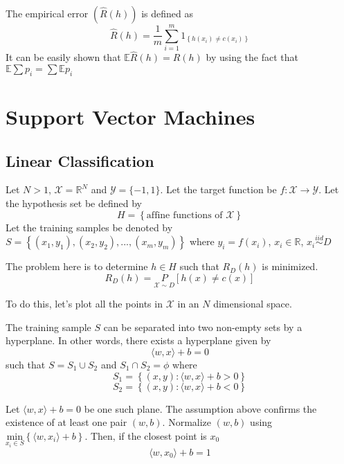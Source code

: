 \documentclass[a4paper,english,12pt]{article}
\begin{document}
\begin{defn}
The empirical error $(\hat{R}(h))$ is defined as
$$ \hat{R}(h) = \frac{1}{m} \sum_{i=1}^m 1_{ \left\{ h(x_i) \neq c(x_i) \right\} }$$
It can be easily shown that $\mathbb{E} \hat{R}(h) = R(h)$ by using the fact that $\mathbb{E} \sum p_i = \sum \mathbb{E} p_i$
\end{defn}

\section{Support Vector Machines}
\subsection{Linear Classification}

\begin{assum}
Let $N>1$, $\mathcal{X} = \mathbb{R}^N$ and $\mathcal{Y} = \{-1, 1\}$. Let the target function be $f:\mathcal{X} \rightarrow \mathcal{Y}$. Let the hypothesis set be defined by
$$ H = \left\{ \textrm{affine functions of }\mathcal{X} \right\} $$
Let the training samples be denoted by $S = \left\{ (x_1, y_1), (x_2, y_2), ... , (x_m, y_m) \right\}$ where $ y_i = f(x_i)$, $x_i \in \mathbb{R}$, $x_i \overset{iid} \sim D$

\end{assum}

The problem here is to determine $h \in H$ such that $R_D (h)$ is minimized.
$$ R_D (h) = \underset{\mathcal{X} \sim D} P \left[ h(x) \neq c(x) \right] $$

To do this, let's plot all the points in $\mathcal{X}$ in an $N$ dimensional space.

\begin{assum}
The training sample $S$ can be separated into two non-empty sets by a hyperplane. In other words, there exists a hyperplane given by
$$ \langle w,x \rangle + b = 0 $$
such that $S=S_1 \cup S_2$ and $S_1 \cap S_2 = \phi$ where
$$S_1 = \left\{ (x,y): \langle w,x \rangle +b > 0  \right\}$$
$$S_2 = \left\{ (x,y): \langle w,x \rangle +b < 0  \right\}$$

\end{assum}

Let $\langle w,x \rangle + b = 0$ be one such plane. The assumption above confirms the existence of at least one pair $(w,b)$. Normalize $(w,b)$ using $\underset{x_i \in S} {\mathrm{min}} \left\{ \langle w,x_i \rangle + b \right\}$. Then, if the closest point is $x_0$
$$ \langle w,x_0 \rangle + b = 1 $$
\end{document}
